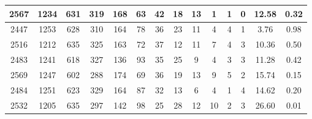 \documentclass[12pt,a4paper]{article}
\begin{document}
\begin{center}
\begin{tabular}{|c|c|c|c|c|c|c|c|c|c|c|c|c|c|}
2567 & 1234 & 631 & 319 & 168 & 63 & 42 & 18 & 13 & 1 & 1 & 0 & 12.58 &  0.32\\ \hline
2447 & 1253 & 628 & 310 & 164 & 78 & 36 & 23 & 11 & 4 & 4 & 1 &  3.76 &  0.98\\ \hline
2516 & 1212 & 635 & 325 & 163 & 72 & 37 & 12 & 11 & 7 & 4 & 3 & 10.36 &  0.50\\ \hline
2483 & 1241 & 618 & 327 & 136 & 93 & 35 & 25 & 9 & 4 & 3 & 3 & 11.28 &  0.42\\ \hline
2569 & 1247 & 602 & 288 & 174 & 69 & 36 & 19 & 13 & 9 & 5 & 2 & 15.74 &  0.15\\ \hline
2484 & 1251 & 623 & 329 & 164 & 87 & 32 & 13 & 6 & 4 & 1 & 4 & 14.62 &  0.20\\ \hline
2532 & 1205 & 635 & 297 & 142 & 98 & 25 & 28 & 12 & 10 & 2 & 3 & 26.60 &  0.01\\ \hline
\end{tabular}
\end{center}
\end{document}
